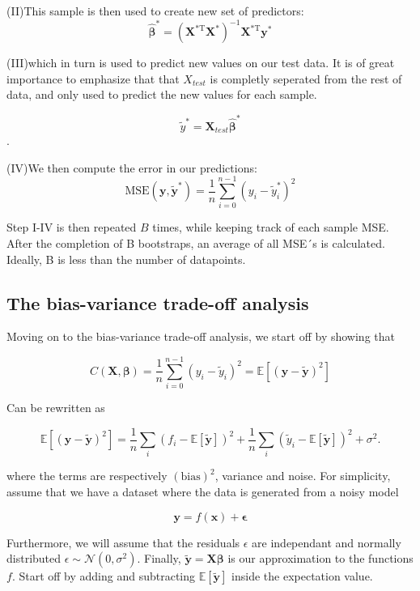 \documentclass[11pt, a4paper]{article}
\begin{document}
(II)This sample is then used to create new set of predictors: 
\[
  \bm{\hat{\beta}}^* = \left(\bm{X}^\text{*T}\bm{X}^*\right)^{-1}\bm{X}^\text{*T}\bm{y}^*
\]

(III)which in turn is used to predict new values on our test data. It is of great importance to emphasize that that $X_{test}$ is completly seperated from the rest of data, and only used to predict the new values for each sample.


$$\tilde{y}^* = \bm{X}_{test}\bm{\hat{\beta}^*}$$.

(IV)We then compute the error in our predictions:
\[
  \text{MSE}(\boldsymbol{y},\boldsymbol{\tilde{y}^*}) = \frac{1}{n}
  \sum_{i=0}^{n-1}(y_i-\tilde{y}^{*}_i)^2
\]
 
Step I-IV is then repeated $B$ times, while keeping track of each sample MSE. After the completion of B bootstraps, an average of all MSE´s is calculated. Ideally, B is less than the number of datapoints.


\subsection*{The bias-variance trade-off analysis}

Moving on to the bias-variance trade-off analysis, we start off by showing that 

\[
  C(\bm{X},\bm{\beta}) =\frac{1}{n}\sum_{i=0}^{n-1}(y_i-\tilde{y}_i)^2=\mathbb{E}\left[(\bm{y}-\bm{\tilde{y}})^2\right]
\]

Can be rewritten as

\[
\mathbb{E}\left[(\bm{y}-\bm{\tilde{y}})^2\right]=\frac{1}{n}\sum_i(f_i-\mathbb{E}\left[\bm{\tilde{y}}\right])^2+\frac{1}{n}\sum_i(\tilde{y}_i-\mathbb{E}\left[\bm{\tilde{y}}\right])^2+\sigma^2.
\]

where the terms are respectively $(\text{bias})^2$, variance and noise. For simplicity, assume that we have a dataset where the data is generated from a noisy model

\[\bm{y} = f(\bm{x}) + \bm{\epsilon}\]

Furthermore, we will assume that the residuals $\epsilon$ are independant and normally distributed $\epsilon \sim \mathcal{N}(0, \sigma^2)$. Finally, $\bm{\tilde{y}} = \bm{X}\bm{\beta}$ is our approximation to the functions $f$. Start off by adding and subtracting $\mathbb{E}\left[\bm{\tilde{y}}\right]$ inside the expectation value.
\end{document}
